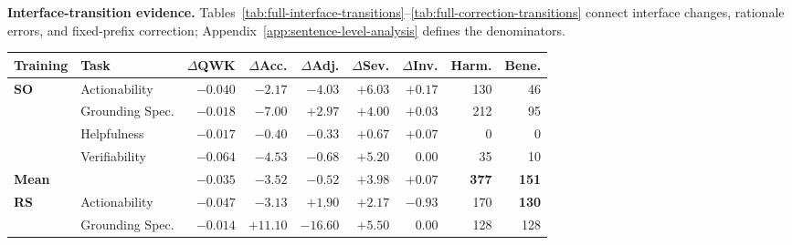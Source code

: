 \begingroup
\fontsize{10pt}{11.2pt}\selectfont

\noindent\textbf{Interface-transition evidence.}
Tables~\ref{tab:full-interface-transitions}--\ref{tab:full-correction-transitions}
connect interface changes, rationale errors, and fixed-prefix correction;
Appendix~\ref{app:sentence-level-analysis} defines the denominators.
\par
\endgroup

\begin{table}[!tp]
\centering
\captionsetup{font=normalsize,skip=2pt}
\small
\setlength{\tabcolsep}{3pt}
\renewcommand{\arraystretch}{1.05}

\begin{tabular}{@{}llrrrrrrr@{}}
\toprule
Training & Task
& $\Delta$QWK
& $\Delta$Acc.
& $\Delta$Adj.
& $\Delta$Sev.
& $\Delta$Inv.
& Harm.
& Bene. \\
\midrule

\multirow{4}{*}{\textbf{SO}}
& Actionability
& $-0.040$ & $-2.17$ & $-4.03$ & $+6.03$ & $+0.17$
& 130 & 46 \\

& Grounding Spec.
& $-0.018$ & $-7.00$ & $+2.97$ & $+4.00$ & $+0.03$
& 212 & 95 \\

& Helpfulness
& $-0.017$ & $-0.40$ & $-0.33$ & $+0.67$ & $+0.07$
& 0 & 0 \\

& Verifiability
& $-0.064$ & $-4.53$ & $-0.68$ & $+5.20$ & $0.00$
& 35 & 10 \\

\cmidrule(l){2-9}
\textbf{Mean} &
& $\mathbf{-0.035}$
& $\mathbf{-3.52}$
& $\mathbf{-0.52}$
& $\mathbf{+3.98}$
& $\mathbf{+0.07}$
& \textbf{377}
& \textbf{151} \\

\midrule

\multirow{4}{*}{\textbf{RS}}
& Actionability
& $-0.047$ & $-3.13$ & $\mathbf{+1.90}$ & $+2.17$
& $\mathbf{-0.93}$ & 170 & \textbf{130} \\

& Grounding Spec.
& $-0.014$ & $\mathbf{+11.10}$ & $\mathbf{-16.60}$
& $+5.50$ & $0.00$ & 128 & 128 \\


\end{tabular}
\end{table}
